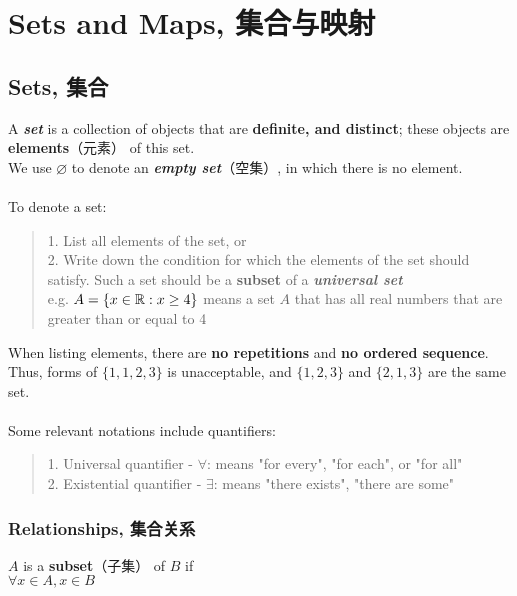 \section{Sets and Maps, 集合与映射}

\subsection{Sets, 集合}
A \textbf{\textit{set}} is a collection of objects that are \textbf{definite, and distinct}; these objects are \textbf{elements}（元素） of this set. \\
We use $\varnothing$ to denote an \textbf{\textit{empty set}}（空集）, in which there is no element. \\
\\
To denote a set:
\begin{quote}
    1. List all elements of the set, or \\
    2. Write down the condition for which the elements of the set should satisfy. Such a set should be a \textbf{subset} of a \textbf{\textit{universal set}} \\
    e.g. $A = \{x \in \mathbb{R}: x \ge 4\}$ means a set $A$ that has all real numbers that are greater than or equal to 4
\end{quote}
When listing elements, there are \textbf{no repetitions} and \textbf{no ordered sequence}. Thus, forms of $\{1, 1, 2, 3\}$ is unacceptable, and $\{1, 2, 3\}$ and $\{2, 1, 3\}$ are the same set. \\
\\
Some relevant notations include quantifiers:
\begin{quote}
    1. Universal quantifier - $\forall$: means "for every", "for each", or "for all" \\
    2. Existential quantifier - $\exists$: means "there exists", "there are some"
\end{quote}

\subsubsection{Relationships, 集合关系}
\begin{definition}
    $A$ is a \textbf{subset}（子集） of $B$ if \\
    $\forall x \in A, x \in B$
\end{definition}

